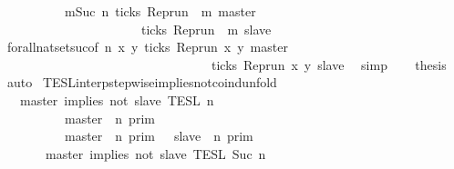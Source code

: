 \begin{isabellebody}
\ \ \ \ \ \ \ \ {\isasyminter}\ {\isacharbraceleft}{\isasymrho}{\isachardot}\ {\isasymforall}m{\isasymge}Suc\ n{\isachardot}\ ticks\ {\isacharparenleft}{\isacharparenleft}Rep{\isacharunderscore}run\ {\isasymrho}{\isacharparenright}\ m\ master{\isacharparenright}\isanewline
\ \ \ \ \ \ \ \ \ \ \ \ \ \ \ \ \ \ \ \ \ {\isasymlongrightarrow}\ ticks\ {\isacharparenleft}{\isacharparenleft}Rep{\isacharunderscore}run\ {\isasymrho}{\isacharparenright}\ m\ slave{\isacharparenright}{\isacharbraceright}{\isacartoucheclose}\isanewline
\ \ \ \ \isamarkupfalse%
\ forall{\isacharunderscore}nat{\isacharunderscore}set{\isacharunderscore}suc{\isacharbrackleft}of\ {\isacartoucheopen}n{\isacartoucheclose}\ {\isacartoucheopen}{\isasymlambda}x\ y{\isachardot}\ ticks\ {\isacharparenleft}{\isacharparenleft}Rep{\isacharunderscore}run\ x{\isacharparenright}\ y\ master{\isacharparenright}\isanewline
\ \ \ \ \ \ \ \ \ \ \ \ \ \ \ \ \ \ \ \ \ \ \ \ \ \ \ \ \ \ \ \ {\isasymlongrightarrow}\ ticks\ {\isacharparenleft}{\isacharparenleft}Rep{\isacharunderscore}run\ x{\isacharparenright}\ y\ slave{\isacharparenright}{\isacartoucheclose}{\isacharbrackright}\ \isamarkupfalse%
\ simp\isanewline
\ \ \isamarkupfalse%
\ {\isacharquery}thesis\ \isamarkupfalse%
\ auto\isanewline
{}\isamarkupfalse%
%
\endisatagproof
{\isafoldproof}%
%
\isadelimproof
\isanewline
%
\endisadelimproof
\isanewline
{}\isamarkupfalse%
\ TESL{\isacharunderscore}interp{\isacharunderscore}stepwise{\isacharunderscore}implies{\isacharunderscore}not{\isacharunderscore}coind{\isacharunderscore}unfold{\isacharcolon}\isanewline
\ \ {\isacartoucheopen}{\isasymlbrakk}\ master\ implies\ not\ slave\ {\isasymrbrakk}\isactrlsub T\isactrlsub E\isactrlsub S\isactrlsub L\isactrlbsup {\isasymge}\ n\isactrlesup \ {\isacharequal}\isanewline
\ \ \ \ \ {\isacharparenleft}\ \ \ \ {\isasymlbrakk}\ master\ {\isasymnot}{\isasymUp}\ n\ {\isasymrbrakk}\isactrlsub p\isactrlsub r\isactrlsub i\isactrlsub m\ \ \ \ \ \ \ \ \ \ \ \ \ \ \ \ \ \ \ \ \ \ \ %
\isanewline
\ \ \ \ \ \ \ \ {\isasymunion}\ {\isasymlbrakk}\ master\ {\isasymUp}\ n\ {\isasymrbrakk}\isactrlsub p\isactrlsub r\isactrlsub i\isactrlsub m\ {\isasyminter}\ {\isasymlbrakk}\ slave\ {\isasymnot}{\isasymUp}\ n\ {\isasymrbrakk}\isactrlsub p\isactrlsub r\isactrlsub i\isactrlsub m{\isacharparenright}\ \ %
\isanewline
\ \ \ \ \ {\isasyminter}\ {\isasymlbrakk}\ master\ implies\ not\ slave\ {\isasymrbrakk}\isactrlsub T\isactrlsub E\isactrlsub S\isactrlsub L\isactrlbsup {\isasymge}\ Suc\ n\isactrlesup {\isacartoucheclose}\isanewline

\end{isabellebody}
